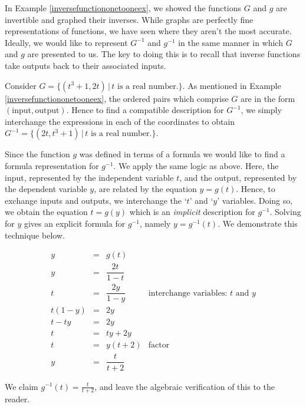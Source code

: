 \documentclass{ximera}
\begin{document}
 In Example \ref{inversefunctiononetooneex}, we showed the functions $G$ and  $g$ are invertible and graphed their inverses.  While graphs are perfectly fine representations of functions, we have seen where they aren't the most accurate.  Ideally, we would like to represent $G^{-1}$ and $g^{-1}$ in the same manner in which $G$ and $g$ are presented to us.  The key to doing this is to recall that inverse functions take outputs back to their associated inputs.
 
 \smallskip
 
 Consider $G = \{ (t^3+1, 2t) \, | \, \text{$t$ is a real number.} \}$.  As mentioned in Example \ref{inversefunctiononetooneex}, the ordered pairs which comprise $G$ are in the form  $(\text{input}, \text{output})$.  Hence to find a compatible description for $G^{-1}$, we simply interchange the expressions in each of the coordinates to obtain  $G^{-1} = \{ (2t, t^3+1) \, | \, \text{$t$ is a real number.} \}$.
 
  \smallskip
 
Since the function $g$ was defined in terms of a formula we would like to find a formula representation for $g^{-1}$.  We apply the same logic as above.  Here, the input, represented by the independent variable $t$, and the output, represented by the dependent variable $y$, are related   by the  equation $y = g(t)$.  Hence, to exchange inputs and outputs,  we interchange the `$t$' and `$y$' variables.  Doing so, we obtain the equation $t = g(y)$  which is an \textit{implicit} description for $g^{-1}$.  Solving for $y$ gives an explicit formula for $g^{-1}$, namely $y = g^{-1}(t)$.  We demonstrate this technique below.

 
 \[ \begin{array}{rclr}
y & = & g(t) & \\ [5pt]
y & = &  \dfrac{2t}{1-t} & \\ [7pt]
t & = & \dfrac{2y}{1-y} & \text{interchange variables: $t$ and $y$} \\ [3pt]
t(1-y) & = & 2y & \\ [3pt]
t-ty & = & 2y & \\ [3pt]
t & = & ty + 2y & \\ [3pt]
t & = & y(t+2) & \text{factor}\\ [8pt]
y & = & \dfrac{t}{t+2}
\end{array} \]

We claim $g^{-1}(t) = \frac{t}{t+2}$, and leave the algebraic verification of this to the reader.

\smallskip
\end{document}
